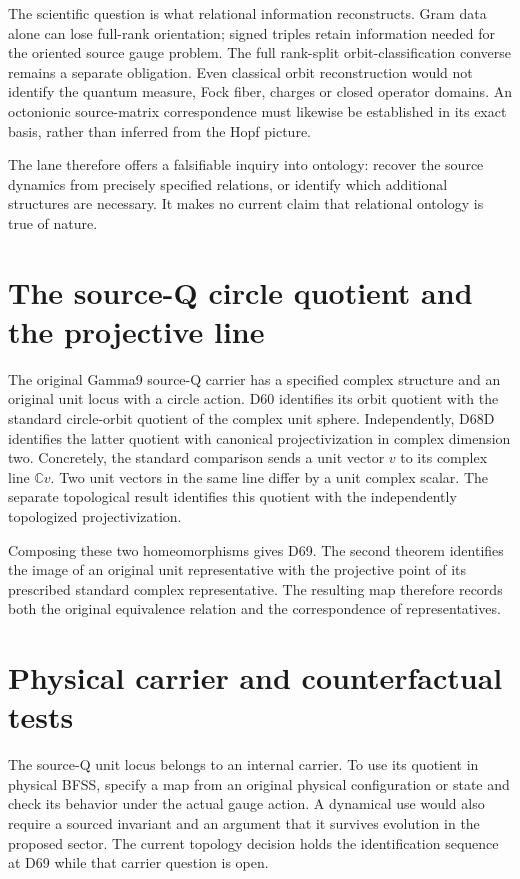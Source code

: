 The scientific question is what relational information reconstructs.
Gram data alone can lose full-rank orientation; signed triples retain
information needed for the oriented source gauge problem. The full
rank-split orbit-classification converse remains a separate obligation.
Even classical orbit reconstruction would not identify the quantum
measure, Fock fiber, charges or closed operator domains. An
octonionic source-matrix correspondence must likewise be established
in its exact basis, rather than inferred from the Hopf picture.

The lane therefore offers a falsifiable inquiry into ontology:
recover the source dynamics from precisely specified relations, or
identify which additional structures are necessary. It makes no
current claim that relational ontology is true of nature.

\section{The source-Q circle quotient and the projective line}
\label{sec:d69-projective}
The original Gamma9 source-Q carrier has a specified complex
structure and an original unit locus with a circle action.
D60 identifies its orbit quotient with the standard circle-orbit
quotient of the complex unit sphere. Independently, D68D identifies
the latter quotient with canonical projectivization in complex
dimension two. Concretely, the standard comparison sends a unit
vector \(v\) to its complex line \(\mathbb C v\). Two unit vectors
in the same line differ by a unit complex scalar. The separate
topological result identifies this quotient with the independently
topologized projectivization.

Composing these two homeomorphisms gives D69. The second theorem
identifies the image of an original unit representative with the
projective point of its prescribed standard complex representative.
The resulting map therefore records both the original equivalence
relation and the correspondence of representatives.

\section{Physical carrier and counterfactual tests}
The source-Q unit locus belongs to an internal carrier. To use its
quotient in physical BFSS, specify a map from an original physical
configuration or state and check its behavior under the actual
gauge action. A dynamical use would also require a sourced
invariant and an argument that it survives evolution in the
proposed sector. The current topology decision holds the
identification sequence at D69 while that carrier question is open.

